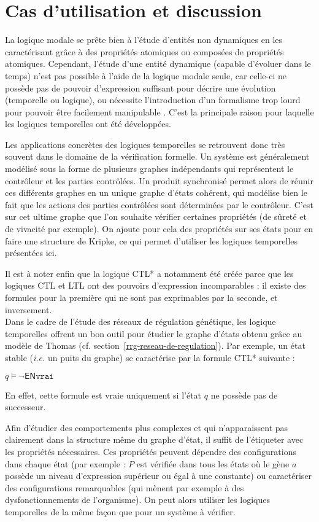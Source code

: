\section{Cas d'utilisation et discussion}
La logique modale se prête bien à l'étude d'entités non dynamiques en les caractérisant grâce à des propriétés atomiques ou composées de propriétés atomiques. Cependant, l'étude d'une entité dynamique (capable d'évoluer dans le temps) n'est pas possible à l'aide de la logique modale seule, car celle-ci ne possède pas de pouvoir d'expression suffisant pour décrire une évolution (temporelle ou logique), ou nécessite l'introduction d'un formalisme trop lourd pour pouvoir être facilement manipulable \cite{schnoebelen-99}. C'est la principale raison pour laquelle les logiques temporelles ont été développées.

Les applications concrètes des logiques temporelles se retrouvent donc très souvent dans le domaine de la vérification formelle. Un système est généralement modélisé sous la forme de plusieurs graphes indépendants qui représentent le contrôleur et les parties contrôlées. Un produit synchronisé permet alors de réunir ces différents graphes en un unique graphe d'états cohérent, qui modélise bien le fait que les actions des parties contrôlées sont déterminées par le contrôleur. C'est sur cet ultime graphe que l'on souhaite vérifier certaines propriétés (de sûreté et de vivacité par exemple). On ajoute pour cela des propriétés sur ses états pour en faire une structure de Kripke, ce qui permet d'utiliser les logiques temporelles présentées ici.

Il est à noter enfin que la logique CTL* a notamment été créée parce que les logiques CTL et LTL ont des pouvoirs d'expression incomparables \cite{berard-08} : il existe des formules pour la première qui ne sont pas exprimables par la seconde, et inversement.\\

Dans le cadre de l'étude des réseaux de régulation génétique, les logique temporelles offrent un bon outil pour étudier le graphe d'états obtenu grâce au modèle de Thomas (cf. section~\ref{rrg-reseau-de-regulation}). Par exemple, un état stable (\textit{i.e.} un puits du graphe) se caractérise par la formule CTL* suivante :
\begin{listesanspuce}
  \item $q \models \neg \mathsf{EN} \texttt{vrai}$
\end{listesanspuce}
En effet, cette formule est vraie uniquement si l'état $q$ ne possède pas de successeur.

Afin d'étudier des comportements plus complexes et qui n'apparaissent pas clairement dans la structure même du graphe d'état, il suffit de l'étiqueter avec les propriétés nécessaires. Ces propriétés peuvent dépendre des configurations dans chaque état (par exemple : $P$ est vérifiée dans tous les états où le gène $a$ possède un niveau d'expression supérieur ou égal à une constante) ou caractériser des configurations remarquables (qui mènent par exemple à des dysfonctionnements de l'organisme). On peut alors utiliser les logiques temporelles de la même façon que pour un système à vérifier.
